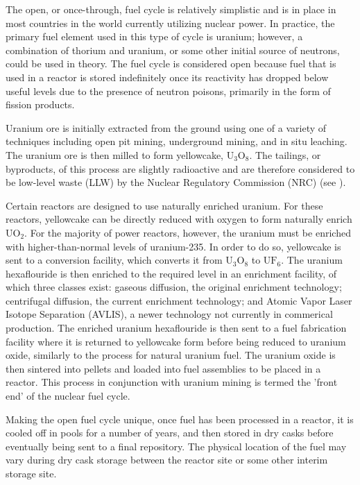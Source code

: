 
The open, or once-through, fuel cycle is relatively simplistic and is in place
in most countries in the world currently utilizing nuclear power. In practice,
the primary fuel element used in this type of cycle is uranium; however, a
combination of thorium and uranium, or some other initial source of neutrons,
could be used in theory. The fuel cycle is considered open because fuel that is
used in a reactor is stored indefinitely once its reactivity has dropped below
useful levels due to the presence of neutron poisons, primarily in the form of
fission products.

Uranium ore is initially extracted from the ground using one of a variety of
techniques including open pit mining, underground mining, and in situ
leaching. The uranium ore is then milled to form yellowcake,
$\mathrm{U_3O_8}$. The tailings, or byproducts, of this process are slightly
radioactive and are therefore considered to be low-level waste (LLW) by the
Nuclear Regulatory Commission (NRC) (see \citet{nrc_10_1985}). 

Certain reactors are designed to use naturally enriched uranium. For these
reactors, yellowcake can be directly reduced with oxygen to form naturally
enrich $\mathrm{UO_2}$. For the majority of power reactors, however, the uranium
must be enriched with higher-than-normal levels of uranium-235. In order to do
so, yellowcake is sent to a conversion facility, which converts it from
$\mathrm{U_3O_8}$ to $\mathrm{UF_6}$. The uranium hexaflouride is then enriched
to the required level in an enrichment facility, of which three classes exist:
gaseous diffusion, the original enrichment technology; centrifugal diffusion,
the current enrichment technology; and Atomic Vapor Laser Isotope Separation
(AVLIS), a newer technology not currently in commerical production. The enriched
uranium hexaflouride is then sent to a fuel fabrication facility where it is
returned to yellowcake form before being reduced to uranium oxide, similarly to
the process for natural uranium fuel. The uranium oxide is then sintered into
pellets and loaded into fuel assemblies to be placed in a reactor. This process
in conjunction with uranium mining is termed the 'front end' of the nuclear fuel
cycle.

Making the open fuel cycle unique, once fuel has been processed in a reactor, it
is cooled off in pools for a number of years, and then stored in dry casks
before eventually being sent to a final repository. The physical location of the
fuel may vary during dry cask storage between the reactor site or some other
interim storage site.

